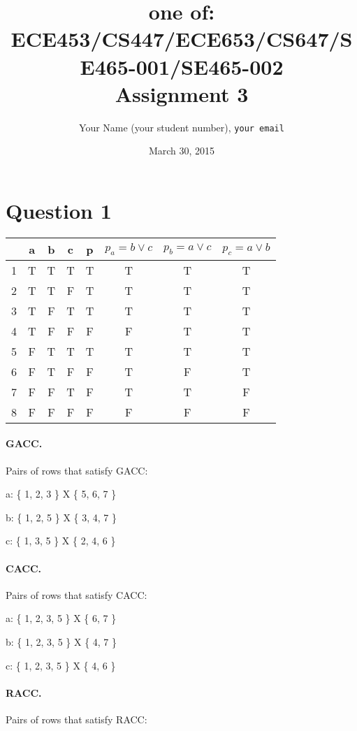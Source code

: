 \documentclass[12pt]{article}
\title{one of: ECE453/CS447/ECE653/CS647/SE465-001/SE465-002\\Assignment 3}
\author{Your Name (your student number), {\tt your email}}
\date{March 30, 2015}
\begin{document}
\maketitle

\section*{Question 1}
\begin{center}
\begin{tabular}{|c|c|c|c||c||c|c|c|}
\hline
   & a & b & c & p & $p_a = b \vee c$ & $p_b = a \vee c$ & $p_c = a \vee b$ \\ \hline
1 & T & T & T & T   & T & T & T \\ \hline
2 & T & T & F & T   & T & T & T \\ \hline
3 & T & F & T & T   & T & T & T \\ \hline
4 & T & F & F & F   & F & T & T \\ \hline
5 & F & T & T & T   & T & T & T \\ \hline
6 & F & T & F & F   & T & F & T \\ \hline
7 & F & F & T & F   & T & T & F \\ \hline
8 & F & F & F & F   & F & F & F \\ \hline
\end{tabular}
\end{center}

\paragraph{GACC.} Pairs of rows that satisfy GACC:

a: \{ 1, 2, 3 \} X \{ 5, 6, 7 \}

b: \{ 1, 2, 5 \} X \{ 3, 4, 7 \}

c: \{ 1, 3, 5 \} X \{ 2, 4, 6 \}
 
\paragraph{CACC.} Pairs of rows that satisfy CACC:

a: \{ 1, 2, 3, 5 \} X \{ 6, 7 \}

b: \{ 1, 2, 3, 5 \} X \{ 4, 7 \}

c: \{ 1, 2, 3, 5 \} X \{ 4, 6 \}  

\paragraph{RACC.} Pairs of rows that satisfy RACC: 
\end{document}
